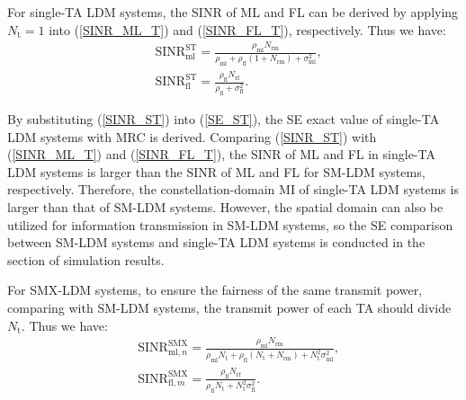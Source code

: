 \documentclass[journal]{IEEEtran}
\begin{document}
For single-TA LDM systems, the SINR of ML and FL can be derived by applying $N_\text{t} = 1$ into (\ref{SINR_ML_T}) and (\ref{SINR_FL_T}), respectively. Thus we have:
\begin{equation}
\begin{split}
&\text{SINR}_\text{ml}^\text{ST} = \frac{\rho_\text{ml}N_\text{rm}} {\rho_\text{ml}+ \rho_\text{fl}(1 + N_\text{rm}) + \sigma_\text{ml}^2},\\
&\text{SINR}_\text{fl}^\text{ST} = \frac{\rho_\text{fl}N_\text{rf}} {\rho_\text{fl} + \sigma_\text{fl}^2}.
\end{split}
\label{SINR_ST}
\end{equation}

By substituting (\ref{SINR_ST}) into (\ref{SE_ST}), the SE exact value of single-TA LDM systems with MRC is derived. Comparing (\ref{SINR_ST}) with (\ref{SINR_ML_T}) and (\ref{SINR_FL_T}), the SINR of ML and FL in single-TA LDM systems is larger than the SINR of ML and FL for SM-LDM systems, respectively. Therefore, the constellation-domain MI of single-TA LDM systems is larger than that of SM-LDM systems. However, the spatial domain can also be utilized for information transmission in SM-LDM systems, so the SE comparison between SM-LDM systems and single-TA LDM systems is conducted in the section of simulation results.

For SMX-LDM systems, to ensure the fairness of the same transmit power, comparing with SM-LDM systems, the transmit power of each TA should divide $N_\text{t}$. Thus we have:
\begin{equation}
\begin{split}
&\text{SINR}_{\text{ml},n}^\text{SMX} = \frac{\rho_\text{ml}N_\text{rm}} {\rho_\text{ml}N_\text{t} + \rho_\text{fl}(N_\text{t}+N_\text{rm}) + N_\text{t}^2\sigma_\text{ml}^2}, \\
&\text{SINR}_{\text{fl},m}^\text{SMX} = \frac{\rho_\text{fl}N_\text{rf}} {\rho_\text{fl}N_\text{t} + N_\text{t}^2\sigma_\text{fl}^2}.
\end{split}
\label{SINR_SMX}
\end{equation}
\end{document}
